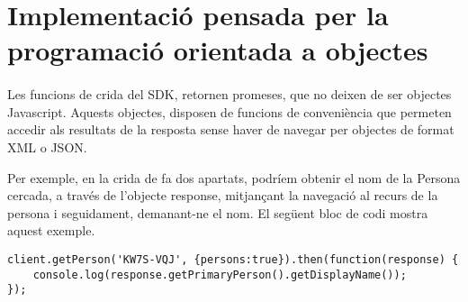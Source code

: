 \section{Implementació pensada per la programació orientada a objectes}

    \paragraph{}
    Les funcions de crida del SDK, retornen promeses, que no deixen de ser objectes Javascript. Aquests objectes, disposen de funcions de conveniència que permeten accedir als resultats de la resposta sense haver de navegar per objectes de format XML o JSON.

    Per exemple, en la crida de fa dos apartats, podríem obtenir el nom de la Persona cercada, a través de l’objecte response, mitjançant la navegació al recurs de la persona i seguidament, demanant-ne el nom. El següent bloc de codi mostra aquest exemple.

\begin{lstlisting}[style=rawOwn,caption={Example navagació per l'objecte \emph{response}}]
client.getPerson('KW7S-VQJ', {persons:true}).then(function(response) {
    console.log(response.getPrimaryPerson().getDisplayName());
});
\end{lstlisting}
